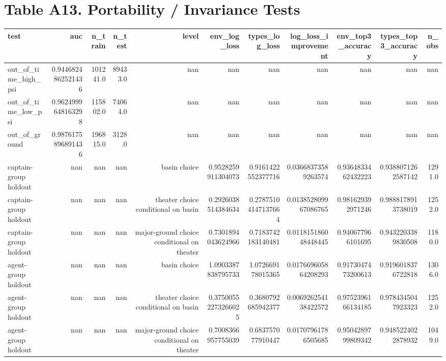 \documentclass{article}
\begin{document}
\section*{Table A13. Portability / Invariance Tests}
\begin{tabular}{lrrrrrrrrrr}
\hline
test & auc & n_train & n_test & level & env_log_loss & types_log_loss & log_loss_improvement & env_top3_accuracy & types_top3_accuracy & n_obs \\
\hline
out\_of\_time\_high\_psi & 0.9446824862521436 & 101241.0 & 89433.0 & nan & nan & nan & nan & nan & nan & nan \\
out\_of\_time\_low\_psi & 0.9624999648163298 & 115802.0 & 74064.0 & nan & nan & nan & nan & nan & nan & nan \\
out\_of\_ground & 0.9876175896891436 & 196815.0 & 3128.0 & nan & nan & nan & nan & nan & nan & nan \\
captain-group holdout & nan & nan & nan & basin choice & 0.9528259911304073 & 0.9161422552377716 & 0.03668373589263574 & 0.9364833462432223 & 0.9388071262587142 & 1291.0 \\
captain-group holdout & nan & nan & nan & theater choice conditional on basin & 0.2926038514384634 & 0.27875104147137664 & 0.013852809967086765 & 0.981629392971246 & 0.9888178913738019 & 1252.0 \\
captain-group holdout & nan & nan & nan & major-ground choice conditional on theater & 0.7301894043624966 & 0.7183742183140481 & 0.011815186048448445 & 0.940677966101695 & 0.9432203389830508 & 1180.0 \\
agent-group holdout & nan & nan & nan & basin choice & 1.0903387838795733 & 1.072669178015365 & 0.017669605864208293 & 0.9173047473200613 & 0.9196018376722818 & 1306.0 \\
agent-group holdout & nan & nan & nan & theater choice conditional on basin & 0.37500552273266025 & 0.3680792685942377 & 0.006926254138422572 & 0.9752396166134185 & 0.9784345047923323 & 1252.0 \\
agent-group holdout & nan & nan & nan & major-ground choice conditional on theater & 0.7008366957755039 & 0.683757077910447 & 0.01707961786505685 & 0.9504289799809342 & 0.9485224022878932 & 1049.0 \\
\hline
\end{tabular}
\end{document}
